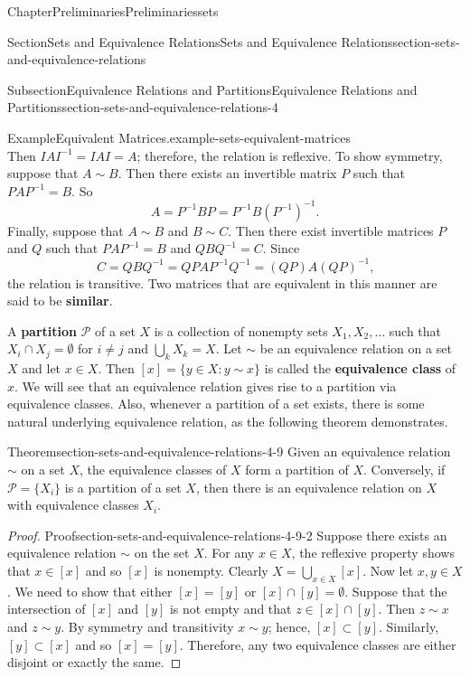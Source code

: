 \documentclass[oneside,10pt,]{book}
\newcommand{\terminology}[1]{\textbf{#1}}
\numberwithin{equation}{section}
\begin{document}
\begin{chapterptx}{Chapter}{Preliminaries}{}{Preliminaries}{}{}{sets}
\begin{sectionptx}{Section}{Sets and Equivalence Relations}{}{Sets and Equivalence Relations}{}{}{section-sets-and-equivalence-relations}
\begin{subsectionptx}{Subsection}{Equivalence Relations and Partitions}{}{Equivalence Relations and Partitions}{}{}{section-sets-and-equivalence-relations-4}
\begin{example}{Example}{Equivalent Matrices.}{example-sets-equivalent-matrices}
\begin{equation*}
\end{equation*}
Then \(IAI^{-1} = IAI = A\); therefore, the relation is reflexive.  To show symmetry, suppose that \(A \sim B\).  Then there exists an invertible matrix \(P\) such that \(PAP^{-1} = B\).  So%
\begin{equation*}
A = P^{-1} B P = P^{-1} B (P^{-1})^{-1}\text{.}
\end{equation*}
Finally, suppose that \(A \sim B\) and \(B \sim C\).  Then there exist invertible matrices \(P\) and \(Q\) such that \(PAP^{-1} = B\) and  \(QBQ^{-1} = C\).  Since%
\begin{equation*}
C = QBQ^{-1} = QPAP^{-1} Q^{-1} = (QP)A(QP)^{-1}\text{,}
\end{equation*}
the relation is transitive.  Two matrices that are equivalent in this manner are said to be \terminology{similar}.%
\end{example}
A \terminology{partition} \({\mathcal P}\) of a set \(X\) is a collection of nonempty sets \(X_1, X_2, \ldots\) such that \(X_i \cap X_j = \emptyset\) for \(i  \neq j\) and \(\bigcup_k X_k = X\). Let \(\sim\) be an equivalence relation on a set \(X\) and let \(x \in X\).  Then \([x] = \{ y \in X : y \sim x \}\) is called the \terminology{equivalence class} of \(x\).  We will see that an equivalence relation gives rise to a partition via equivalence classes.  Also, whenever a partition of a set exists, there is some natural  underlying equivalence relation, as the following theorem demonstrates.%
\begin{theorem}{Theorem}{}{}{section-sets-and-equivalence-relations-4-9}%
Given an equivalence relation \(\sim\) on a set \(X\), the equivalence classes of \(X\) form a partition of \(X\).  Conversely, if \({\mathcal P} = \{ X_i\}\) is a partition of a set \(X\), then there is an equivalence relation on \(X\) with equivalence classes \(X_i\).%
\end{theorem}
\begin{proof}{Proof}{}{section-sets-and-equivalence-relations-4-9-2}
Suppose there exists an equivalence relation \(\sim\) on the set \(X\).  For any \(x \in X\), the reflexive property shows that \(x \in [x]\) and so \([x]\) is nonempty.  Clearly \(X = \bigcup_{x \in X} [x]\).  Now let \(x, y \in X\). We need to show that either \([x] = [y]\) or \([x] \cap [y] = \emptyset\).  Suppose that the intersection of \([x]\) and \([y]\) is not empty and that \(z \in [x] \cap [y]\). Then \(z \sim x\) and \(z \sim y\).  By symmetry and transitivity \(x \sim y\); hence, \([x] \subset [y]\).  Similarly, \([y] \subset [x]\) and so \([x] = [y]\).  Therefore, any two equivalence classes are either disjoint or exactly the same.%

\end{proof}
\end{subsectionptx}
\end{sectionptx}
\end{chapterptx}
\end{document}
